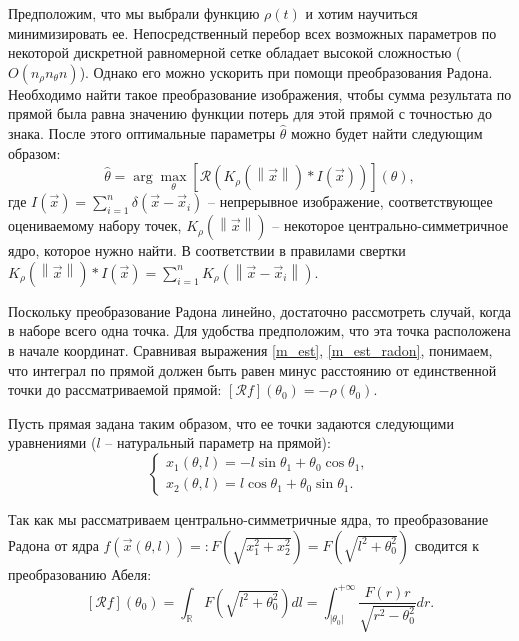 Предположим, что мы выбрали функцию $\rho(t)$ и хотим научиться минимизировать ее.
Непосредственный перебор всех возможных параметров по некоторой дискретной равномерной сетке обладает высокой сложностью ($O\left( n_\rho n_\theta n \right)$).
Однако его можно ускорить при помощи преобразования Радона.
Необходимо найти такое преобразование изображения, чтобы сумма результата по прямой была равна значению функции потерь для этой прямой с точностью до знака.
После этого оптимальные параметры $\hat\theta$ можно будет найти следующим образом:
\begin{equation}
\label{m_est_radon}
    \hat\theta = \arg\max_{\theta} \left[ \mathcal{R} \left( K_{\rho}\left( \left\| \vec x \right\| \right) * I\left( \vec x \right) \right) \right]\left( \theta \right),
\end{equation}
где $I\left( \vec x \right) = \sum_{i=1}^n \delta\left( \vec x - \vec x_i \right)$ -- непрерывное изображение, соответствующее оцениваемому набору точек, $K_{\rho}\left( \left\| \vec x \right\| \right)$ -- некоторое центрально-симметричное ядро, которое нужно найти.
В соответствии в правилами свертки $K_{\rho}\left( \left\| \vec x \right\| \right) * I\left( \vec x \right) = \sum_{i=1}^n K_\rho\left( \left\| \vec x - \vec x_i \right\| \right)$.

Поскольку преобразование Радона линейно, достаточно рассмотреть случай, когда в наборе всего одна точка.
Для удобства предположим, что эта точка расположена в начале координат.
Сравнивая выражения \eqref{m_est}, \eqref{m_est_radon}, понимаем, что интеграл по прямой должен быть равен минус расстоянию от единственной точки до рассматриваемой прямой: $\left[ \mathcal{R}f \right]\left( \theta_0 \right) = -\rho\left( \theta_0 \right)$.

Пусть прямая задана таким образом, что ее точки задаются следующими уравнениями ($l$ -- натуральный параметр на прямой):
\begin{equation*}
    \begin{cases}
        x_1(\theta, l) = -l \sin\theta_1 + \theta_0 \cos\theta_1,\\
        x_2(\theta, l) =  l \cos\theta_1 + \theta_0 \sin\theta_1.
    \end{cases}
\end{equation*}

Так как мы рассматриваем центрально-симметричные ядра, то преобразование Радона от ядра $f\left( \vec x\left( \theta, l \right) \right) =: F\left( \sqrt{x_1^2 + x_2^2} \right) = F\left( \sqrt{l^2 + \theta_0^2} \right)$ сводится к преобразованию Абеля:
\begin{equation*}
    \left[ \mathcal{R}f \right]\left( \theta_0 \right) =
    \int_{\mathbb{R}} F\left( \sqrt{l^2 + \theta_0^2} \right) dl =
    \int_{|\theta_0|}^{+\infty} \frac{F(r)r}{\sqrt{r^2 - \theta_0^2}} dr.
\end{equation*}

